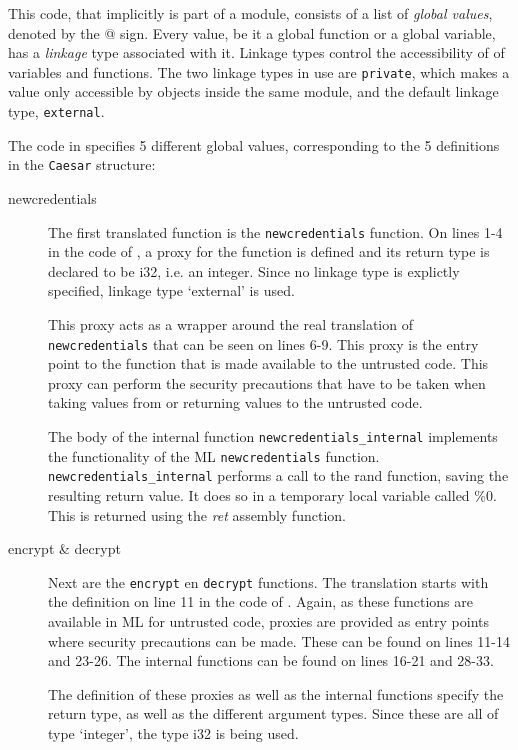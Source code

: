 \documentclass[10pt,a4paper,master=cws, masteroption=ai,english,inputenc=utf8]{kulemt}
\begin{document}
This code, that implicitly is part of a module, consists of a list of \emph{global values}, denoted by the @ sign.
Every value, be it a global function or a global variable, has a \emph{linkage} type associated with it.
Linkage types control the accessibility of of variables and functions. The two linkage types in use are \texttt{private}, which makes a value only accessible by objects inside the same module, and the default linkage type, \texttt{external}.

The code in  specifies 5 different global values, corresponding to the 5 definitions in the \texttt{Caesar} structure:
\begin{description}
\item[newcredentials] The first translated function is the \texttt{newcredentials} function.
On lines 1-4 in the code of , a proxy for the function is defined and its return type is declared to be i32, i.e. an integer. Since no linkage type is explictly specified, linkage type `external'  is used.

This proxy acts as a wrapper around the real translation of \texttt{newcredentials} that can be seen on lines 6-9. This proxy is the entry point to the function that is made available to the untrusted code. This proxy can perform the security precautions that have to be taken when taking values from or returning values to the untrusted code.

The body of the internal function \texttt{newcredentials\_internal} implements the functionality of the ML \texttt{newcredentials} function.
\texttt{newcredentials\_internal} performs a call to the rand function, saving the resulting return value. It does so in a temporary local variable called \%0. This is returned using the \emph{ret} assembly function.

\item[encrypt \& decrypt] Next are the \texttt{encrypt} en \texttt{decrypt} functions. The translation starts with the definition on line 11 in the code of . Again, as these functions are available in ML for untrusted code, proxies are provided as entry points where security precautions can be made. These can be found on lines 11-14 and 23-26. The internal functions can be found on lines 16-21 and 28-33.

The definition of these proxies as well as the internal functions specify the return type, as well as the different argument types. Since these are all of type `integer', the type i32 is being used.


\end{description}
\end{document}
